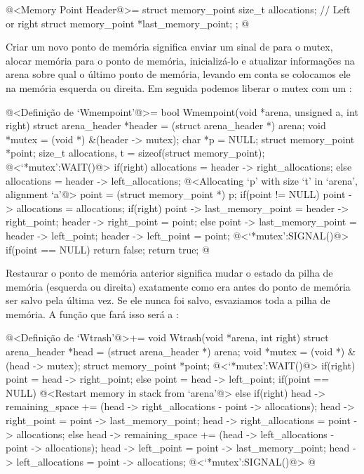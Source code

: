 \iniciocodigo
@<Memory Point Header@>=
struct memory_point{
  size_t allocations; // Left or right
  struct memory_point *last_memory_point;
};
@
\fimcodigo


Criar um novo ponto de memória significa enviar um sinal
de  para o mutex, alocar memória para o ponto de
memória, inicializá-lo e atualizar informações na arena sobre qual o
último ponto de memória, levando em conta se colocamos ele na memória
esquerda ou direita. Em seguida podemos liberar o mutex com
um :

\iniciocodigo
@<Definição de `Wmempoint'@>=
bool Wmempoint(void *arena, unsigned a, int right){
  struct arena_header *header = (struct arena_header *) arena;
  void *mutex = (void *) &(header -> mutex);
  char *p = NULL;
  struct memory_point *point;
  size_t allocations, t = sizeof(struct memory_point);
  @<`*mutex':WAIT()@>
  if(right)
    allocations = header -> right_allocations;
  else
    allocations = header -> left_allocations;
  @<Allocating `p' with size `t' in `arena', alignment `a'@>
  point = (struct memory_point *) p;
  if(point != NULL){
    point -> allocations = allocations;
    if(right){
      point -> last_memory_point = header -> right_point;
      header -> right_point = point;
    }
    else{
      point -> last_memory_point = header -> left_point;
      header -> left_point = point;
    }
  }
  @<`*mutex':SIGNAL()@>
  if(point == NULL)
    return false;
  return true;
}
@
\fimcodigo


Restaurar o ponto de memória anterior significa mudar o estado da
pilha de memória (esquerda ou direita) exatamente como era antes do
ponto de memória ser salvo pela última vez. Se ele nunca foi salvo,
esvaziamos toda a pilha de memória. A função que fará isso será
a :

\iniciocodigo
@<Definição de `Wtrash'@>+=
void Wtrash(void *arena, int right){
  struct arena_header *head = (struct arena_header *) arena;
  void *mutex = (void *) &(head -> mutex);
  struct memory_point *point;
  @<`*mutex':WAIT()@>
  if(right){
    point = head -> right_point;
  }
  else{
    point = head -> left_point;
  }
  if(point == NULL){
    @<Restart memory in stack from `arena'@>
  }
  else{
    if(right){
      head -> remaining_space += (head -> right_allocations -
                                  point -> allocations);
      head -> right_point = point -> last_memory_point;
      head -> right_allocations = point -> allocations;
    }
    else{
      head -> remaining_space += (head -> left_allocations -
                                  point -> allocations);
      head -> left_point = point -> last_memory_point;
      head -> left_allocations = point -> allocations;
    }
  }
  @<`*mutex':SIGNAL()@>
}
@
\fimcodigo



